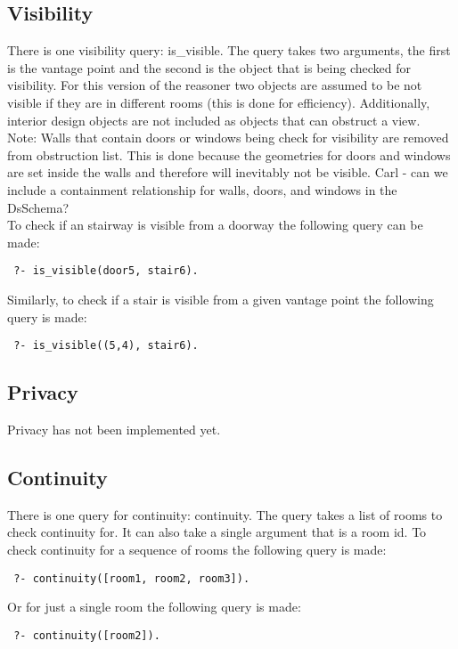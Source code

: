 \documentclass[12pt]{article}
\begin{document}
\subsection{Visibility}
There is one visibility query: is_visible. The query takes two arguments, the first is the vantage point and the second is the object that is being checked for visibility. For this version of the reasoner two objects are assumed to be not visible if they are in different rooms (this is done for efficiency). Additionally, interior design objects are not included as objects that can obstruct a view. \\

\noindent Note: Walls that contain doors or windows being check for visibility are removed from obstruction list. This is done because the geometries for doors and windows are set inside the walls and therefore will inevitably not be visible. Carl - can we include a containment relationship for walls, doors, and windows in the DsSchema? \\

\noindent To check if an stairway is visible from a doorway the following query can be made:
\begin{verbatim}
 ?- is_visible(door5, stair6).
\end{verbatim} Similarly, to check if a stair is visible from a given vantage point the following query is made:
\begin{verbatim}
 ?- is_visible((5,4), stair6).
\end{verbatim}

\subsection{Privacy}
Privacy has not been implemented yet.

\subsection{Continuity}
There is one query for continuity: continuity. The query takes a list of rooms to check continuity for. It can also take a single argument that is a room id. To check continuity for a sequence of rooms the following query is made:
\begin{verbatim}
 ?- continuity([room1, room2, room3]).
\end{verbatim} Or for just a single room the following query is made:
\begin{verbatim}
 ?- continuity([room2]).
\end{verbatim}
\end{document}
